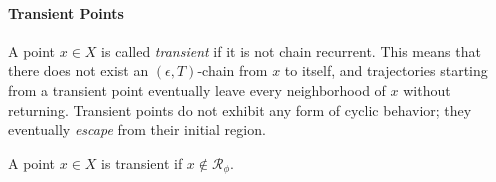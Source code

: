         \paragraph{Transient Points}

            A point $x \in X$ is called \emph{transient} if it is not chain recurrent. This means that there does not exist an $(\epsilon, T)$-chain from $x$ to itself, and trajectories starting from a transient point eventually leave every neighborhood of $x$ without returning. Transient points do not exhibit any form of cyclic behavior; they eventually \emph{escape} from their initial region.
        
            \begin{definition}
                A point $x \in X$ is transient if $x \notin \mathcal{R}_\phi$.
            \end{definition}

